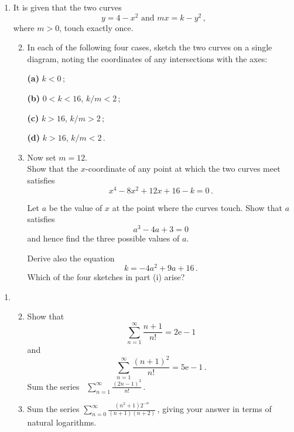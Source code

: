 \documentclass[a4, 11pt]{report}
\newlength{\qspace}
\newcounter{qnumber}
\newenvironment{question}%
 {\vspace{\qspace}
  \begin{enumerate}[\bfseries 1\quad][10]%
    \setcounter{enumi}{\value{qnumber}}%
    \item%
 }
{
  \end{enumerate}
  \filbreak
  \stepcounter{qnumber}
 }
\newenvironment{questionparts}[1][1]%
 {
  \begin{enumerate}[\bfseries (i)]%
    \setcounter{enumii}{#1}
    \addtocounter{enumii}{-1}
    \setlength{\itemsep}{5mm}
    \setlength{\parskip}{8pt}
 }
 {
  \end{enumerate}
 }
\def\e{{\mathrm e}}
\begin{document}
\begin{question}
It is given that the two curves
\[
y=4-x^2
\text{ \ \ \ and \ \ \ }
m  x = k-y^2\,,
\]
where $m>0$, 
touch exactly once. 

\begin{questionparts}
\item
In each of the following four cases, sketch the two curves on a single
diagram, noting the coordinates of any intersections with the axes:

\textbf{(a)} $k <0\, $;

\textbf{(b)} $0<k<16$, $k/m < 2\,$;

\textbf{(c)} $k>16$, $k/m >2\,$;

\textbf{(d)} $k>16$, $k/m <2\,$.


 

\item
Now set $m=12$.\\
Show that the $x$-coordinate of any point at which
the two curves meet satisfies
\[
x^4-8x^2 +12x +16-k=0\,.
\]

 Let $a$ be the value of $x$ at the point where the
curves touch. Show that $a$ satisfies
\[
a^3 -4a +3 =0
\]
and hence find the three possible values of $a$.

Derive also the equation
\[
k= -4a^2 +9a +16\,.
\]
Which of the four sketches in  
part (i) arise?

\end{questionparts}
\end{question}

\begin{question}
\begin{questionparts}
\item
 Show that
\[
\sum_{n=1} ^\infty 
\frac{n+1}{n!} 
=  2\e - 1 
\]
and  
\[
\sum _{n=1}^\infty 
\frac {(n+1)^2}{n!} = 5\e-1\,.
\]
Sum the series   \ $\displaystyle 
\sum _{n=1}^\infty 
\frac {(2n-1)^3}{n!} 
 \,.$ 
\item
Sum the series
$\displaystyle 
\sum_{n=0}^\infty \frac{(n^2+1)2^{-n}}{(n+1)(n+2)}\,$,
giving your answer in terms of natural logarithms.
\end{questionparts}
\end{question}
\end{document}
